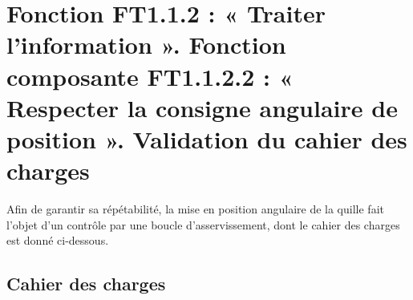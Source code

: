 %
%
%
%
%


\section{Fonction FT1.1.2 : « Traiter l'information ». Fonction composante FT1.1.2.2 : « Respecter la consigne angulaire de position ». Validation du cahier des charges}

\ifprof
\else
Afin de garantir sa répétabilité, la mise en position angulaire de la quille fait l’objet d’un contrôle par une boucle d’asservissement, dont le cahier des charges est donné ci-dessous.

\subsection*{Cahier des charges}

